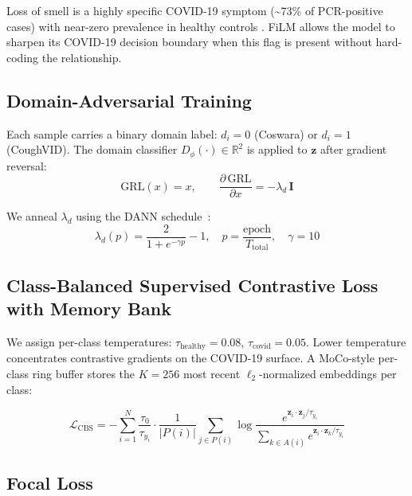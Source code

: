 \documentclass[journal]{IEEEtran}
\newcommand{\R}{\mathbb{R}}
\newcommand{\Lc}{\mathcal{L}}
\begin{document}
Loss of smell is a highly specific COVID-19 symptom
(\textasciitilde{73\%} of PCR-positive cases) with near-zero
prevalence in healthy controls \cite{sympnet2022}. FiLM allows the
model to sharpen its COVID-19 decision boundary when this flag is
present without hard-coding the relationship.

\subsection{Domain-Adversarial Training}
\label{sec:dat}

Each sample carries a binary domain label: $d_i{=}0$ (Coswara)
or $d_i{=}1$ (CoughVID). The domain classifier
$D_\phi(\cdot)\in\R^2$ is applied to $\mathbf{z}$ after gradient
reversal:
\begin{equation}
\mathrm{GRL}(x) = x,\qquad
\frac{\partial\,\mathrm{GRL}}{\partial x} = -\lambda_d\,\mathbf{I}
\label{eq:grl}
\end{equation}

We anneal $\lambda_d$ using the DANN schedule~\cite{ganin2016}:
\begin{equation}
\lambda_d(p) = \frac{2}{1 + e^{-\gamma p}} - 1,\quad
p = \frac{\text{epoch}}{T_\text{total}},\quad \gamma = 10
\label{eq:anneal}
\end{equation}

\subsection{Class-Balanced Supervised Contrastive Loss with Memory Bank}
\label{sec:cbsupcon}

We assign per-class temperatures:
$\tau_\text{healthy}{=}0.08$, $\tau_\text{covid}{=}0.05$.
Lower temperature concentrates contrastive gradients on the COVID-19
surface. A MoCo-style \cite{moco} per-class ring buffer stores the
$K{=}256$ most recent $\ell_2$-normalized embeddings per class:

\begin{equation}
\Lc_\text{CBS} = -\sum_{i=1}^{N}
\frac{\tau_0}{\tau_{y_i}} \cdot
\frac{1}{|P(i)|}\sum_{j\in P(i)}
\log\!\frac{e^{\mathbf{z}_i\cdot\mathbf{z}_j/\tau_{y_i}}}
          {\displaystyle\sum_{k\in A(i)} e^{\mathbf{z}_i\cdot\mathbf{z}_k/\tau_{y_i}}}
\label{eq:cbsupcon}
\end{equation}

\subsection{Focal Loss}
\label{sec:focal}
\end{document}
